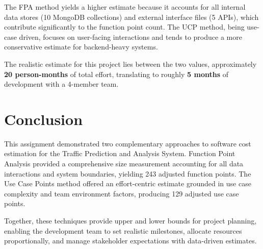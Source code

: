 \documentclass[12pt,a4paper]{article}
\begin{document}
\medskip
\noindent The FPA method yields a higher estimate because it accounts for all internal data stores (10 MongoDB collections) and external interface files (5 APIs), which contribute significantly to the function point count. The UCP method, being use-case driven, focuses on user-facing interactions and tends to produce a more conservative estimate for backend-heavy systems.

\noindent The realistic estimate for this project lies between the two values, approximately \textbf{20 person-months} of total effort, translating to roughly \textbf{5 months} of development with a 4-member team.

\section{Conclusion}
This assignment demonstrated two complementary approaches to software cost estimation for the Traffic Prediction and Analysis System. Function Point Analysis provided a comprehensive size measurement accounting for all data interactions and system boundaries, yielding 243 adjusted function points. The Use Case Points method offered an effort-centric estimate grounded in use case complexity and team environment factors, producing 129 adjusted use case points.

Together, these techniques provide upper and lower bounds for project planning, enabling the development team to set realistic milestones, allocate resources proportionally, and manage stakeholder expectations with data-driven estimates.
\end{document}
